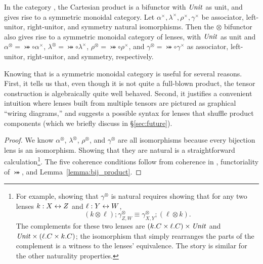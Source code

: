\begin{defn}[$R$-similarity]
\begin{theorem}
\begin{lemma}
\begin{theorem}[No products]
\begin{prop}
In the category \SET, the Cartesian product is a bifunctor with $\mathit{Unit}$ as
unit, and gives rise to a symmetric monoidal category. Let
$\alpha^\times,\lambda^\times,\rho^\times,\gamma^\times$ be associator,
left-unitor, right-unitor, and symmetry natural isomorphisms. Then the
$\otimes$ bifunctor also gives rise to a symmetric monoidal category of
lenses, with $\mathit{Unit}$ as unit and $\alpha^\otimes=\bij\circ\alpha^\times$,
$\lambda^\otimes=\bij\circ\lambda^\times$,
$\rho^\otimes=\bij\circ\rho^\times$, and
$\gamma^\otimes=\bij\circ\gamma^\times$ as associator, left-unitor,
right-unitor, and symmetry, respectively.
\end{prop}

Knowing that \LENS{} is a symmetric monoidal category is useful for several
reasons.  First, it tells us that, even though it is not quite a full-blown
product, the tensor construction is algebraically quite well behaved.
Second, it justifies a convenient intuition where lenses built from multiple
tensors are pictured as graphical ``wiring diagrams,'' and suggests a
possible syntax for lenses that shuffle product components (which we briefly
discuss in \S\ref{sec:future}).

\iflater{}\fi

\iffull
\begin{proof}
We know $\alpha^\otimes$, $\lambda^\otimes$, $\rho^\otimes$, and
$\gamma^\otimes$ are all isomorphisms because every bijection lens is an
isomorphism. Showing that they are natural is a straightforward
calculation\footnote{For example, showing that $\gamma^\otimes$ is natural
requires showing that for any two lenses $k : X \leftrightarrow Z$ and $\ell : Y \leftrightarrow
W$,
\[(k \otimes \ell);\gamma^\otimes_{Z,W} \equiv \gamma^\otimes_{X,Y};(\ell
\otimes k).\]
The complements for these two lenses are $(k.C \times \ell.C) \times \mathit{Unit}$
and $\mathit{Unit} \times (\ell.C \times k.C)$; the isomorphism that simply
rearranges the parts of the complement is a witness to the lenses'
equivalence.  The story is similar for the other naturality properties.}.
The five coherence conditions follow from coherence in \SET, functoriality of
$\bij$, and Lemma~\ref{lemma:bij_product}.
\end{proof}
\fi


\end{theorem}
\end{lemma}
\end{theorem}
\end{defn}
